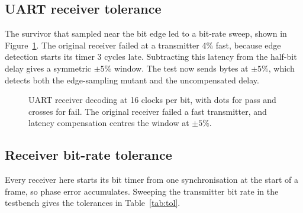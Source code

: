 \documentclass[11pt]{article}
\begin{document}
\subsection{UART receiver tolerance}\label{sec:uarttol}
The survivor that sampled near the bit edge led to a bit-rate sweep, shown in Figure~\ref{fig:tol}.
The original receiver failed at a transmitter 4\% fast, because edge detection starts its timer 3 cycles late.
Subtracting this latency from the half-bit delay gives a symmetric $\pm5\%$ window.
The test now sends bytes at $\pm5\%$, which detects both the edge-sampling mutant and the uncompensated delay.

\begin{figure}[h]
\centering
{}
\caption{UART receiver decoding at 16 clocks per bit, with dots for pass and crosses for fail. The original receiver failed a fast transmitter, and latency compensation centres the window at $\pm5\%$.}
\label{fig:tol}
\end{figure}

\subsection{Receiver bit-rate tolerance}\label{sec:tol}
Every receiver here starts its bit timer from one synchronisation at the start of a frame, so phase error accumulates.
Sweeping the transmitter bit rate in the testbench gives the tolerances in Table~\ref{tab:tol}.
\end{document}
